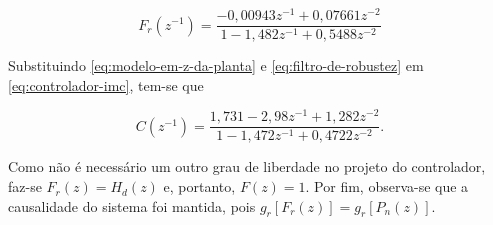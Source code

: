\begin{equation}
    \label{eq:filtro-de-robustez}
    F_r(z^{-1}) = \frac{-0,00943z^{-1}+0,07661z^{-2}}{1-1,482z^{-1}+0,5488z^{-2}}
\end{equation}

Substituindo \ref{eq:modelo-em-z-da-planta} e \ref{eq:filtro-de-robustez} em
\ref{eq:controlador-imc}, tem-se que

\begin{equation}
    \label{eq:controlador-imc-definido}
    C(z^{-1}) = \frac{1,731-2,98z^{-1}+1,282z^{-2}}{1-1,472z^{-1}+0,4722z^{-2}}.
\end{equation}

Como não é necessário um outro grau de liberdade no projeto do controlador,
faz-se $F_r(z) = H_d(z)$ e, portanto, $F(z) = 1$. Por fim, observa-se que a
causalidade do sistema foi mantida, pois $g_r\left [ F_r(z) \right ] = g_r\left
[ P_n(z) \right ]$. 